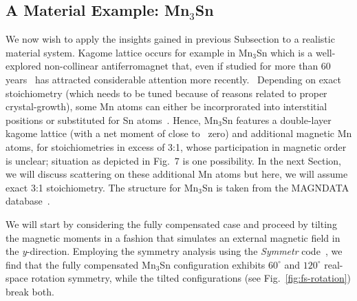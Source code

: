 \documentclass[prb,showpacs,amsmath,amssymb,superscriptaddress,twocolumn,floatfix]{revtex4-1}
\begin{document}
\subsection{A Material Example: Mn$_3$Sn}
\label{sec_I_mat}

We now wish to apply the insights gained in previous Subsection to
a realistic material system. Kagome lattice occurs for example in
Mn$_3$Sn which is a well-explored non-collinear antiferromagnet that, even
if studied for more than 60 years~\cite{Cable:1993_a}  %
has attracted considerable attention more recently.~\cite{Manna:2018, Chen:2021, Nakatsuji:2015}  Depending on exact stoichiometry (which
needs to be tuned because of reasons related to proper crystal-growth),
some Mn atoms can either be incorprorated into interstitial positions
or substituted for Sn atoms~\cite{Gas:2025_a}.
Hence, Mn$_3$Sn features 
a double-layer kagome lattice (with a net moment of close to~\cite{Tomiyashi:1982} zero) and additional magnetic Mn atoms, for stoichiometries in excess of 3:1, whose participation in magnetic order {\color{red} is unclear}; situation as depicted in Fig.~7 is one possibility. 
In the next Section, we will discuss scattering on these additional Mn atoms
but here, we will assume exact 3:1 stoichiometry. The structure for Mn$_3$Sn is taken from the MAGNDATA database~\cite{Magndata:Mn3Sn}.


We will start by considering the fully compensated case and proceed by tilting the magnetic moments in a fashion that simulates an external magnetic field in the \textit{y}-direction.
Employing the symmetry analysis using the \textit{Symmetr} code~\cite{Symmetr}, we find that the fully compensated Mn$_3$Sn configuration exhibits $60^\circ$ and $120^\circ$ real-space rotation symmetry, while the tilted configurations (see Fig.~\ref{fig:fs-rotation}) break both.
\end{document}
